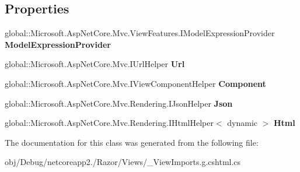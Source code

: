 \subsection*{Properties}
\begin{DoxyCompactItemize}
\item 
\mbox{\label{class_asp_net_core_1_1_views_____view_imports_af24a853448780518b9b8bb0494fc03d0}} 
global\+::\+Microsoft.\+Asp\+Net\+Core.\+Mvc.\+View\+Features.\+I\+Model\+Expression\+Provider {\bfseries Model\+Expression\+Provider}
\item 
\mbox{\label{class_asp_net_core_1_1_views_____view_imports_af6e6f9f7d99285bd76a2db97f17a9128}} 
global\+::\+Microsoft.\+Asp\+Net\+Core.\+Mvc.\+I\+Url\+Helper {\bfseries Url}
\item 
\mbox{\label{class_asp_net_core_1_1_views_____view_imports_aab0dbba5d923b01ca42fc275a31201e4}} 
global\+::\+Microsoft.\+Asp\+Net\+Core.\+Mvc.\+I\+View\+Component\+Helper {\bfseries Component}
\item 
\mbox{\label{class_asp_net_core_1_1_views_____view_imports_a5f8b1527e81afa1bcfca3f907e09a406}} 
global\+::\+Microsoft.\+Asp\+Net\+Core.\+Mvc.\+Rendering.\+I\+Json\+Helper {\bfseries Json}
\item 
\mbox{\label{class_asp_net_core_1_1_views_____view_imports_a5de9e15d8a491c339e580feb37748cac}} 
global\+::\+Microsoft.\+Asp\+Net\+Core.\+Mvc.\+Rendering.\+I\+Html\+Helper$<$ dynamic $>$ {\bfseries Html}
\end{DoxyCompactItemize}


The documentation for this class was generated from the following file\+:\begin{DoxyCompactItemize}
\item 
obj/\+Debug/netcoreapp2./\+Razor/\+Views/\+\_\+\+View\+Imports.\+g.\+cshtml.\+cs\end{DoxyCompactItemize}
